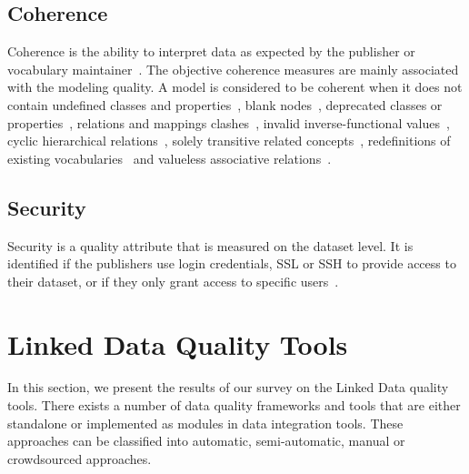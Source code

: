 \documentclass[onecolumn, crcready]{../../Util/LaTEX/iosart2c}
\begin{document}
\subsection{Coherence}
Coherence is the ability to interpret data as expected by the publisher or vocabulary maintainer~\cite{Hogan:LDOW:10}. The objective coherence measures are mainly associated with the modeling quality. A model is considered to be coherent when it does not contain undefined classes and properties~\cite{Hogan:LDOW:10}, blank nodes~\cite{Hogan:WebSemJorunal:12}, deprecated classes or properties~\cite{Hogan:LDOW:10}, relations and mappings clashes~\cite{Suominen:IKEM:12}, invalid inverse-functional values~\cite{Hogan:LDOW:10}, cyclic hierarchical relations~\cite{Dagobert:DL:02,Suominen:IKEM:12,Mader:TBDL:12}, solely transitive related concepts~\cite{Mader:TBDL:12}, redefinitions of existing vocabularies~\cite{Hogan:LDOW:10} and valueless associative relations~\cite{Mader:TBDL:12}.

\subsection{Security}
Security is a quality attribute that is measured on the dataset level. It is identified if the publishers use login credentials, SSL or SSH to provide access to their dataset, or if they only grant access to specific users~\cite{Zaveri:SemWebJorunal:12}.


\section{Linked Data Quality Tools}
\label{sec:quality-tools}
In this section, we present the results of our survey on the Linked Data quality tools. There exists a number of data quality frameworks and tools that are either standalone or implemented as modules in data integration tools. These approaches can be classified into automatic, semi-automatic, manual or crowdsourced approaches.
\end{document}
